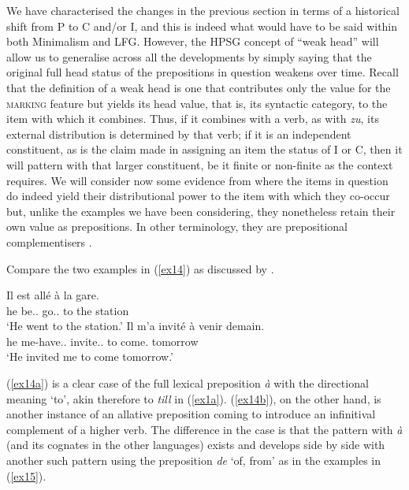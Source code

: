 \documentclass[output=paper]{langsci/langscibook}
\begin{document}
We have characterised the changes in the previous section in terms of a
historical shift from P to C and/or I, and this is indeed what would have to be
said within both Minimalism and \gls{LFG}. However, the \gls{HPSG} concept of
\enquote{weak head} will allow us to generalise across all the developments by
simply saying that the original full head status of the prepositions in
question weakens over time. Recall that the definition of a weak head is one
that contributes only the value for the \textsc{marking} feature but yields its
{\sc head} value, that is, its syntactic category, to the item with which it
combines. Thus, if it combines with a verb, as with  \emph{zu}, its
external distribution is determined by that verb; if it is an independent
constituent, as is the claim made in assigning an item the status of I or C,
then it will pattern with that larger constituent, be it finite or non-finite
as the context requires. We will consider now some evidence from  where
the items in question do indeed yield their distributional power to the item
with which they co-occur but, unlike the  examples we have been
considering, they nonetheless retain their own value as prepositions. In other
terminology, they are prepositional complementisers \citep{Kayne99, Borsley01}.

Compare the two  examples in (\ref{ex14}) as discussed by
\cite{Abeilleetal06}.

\begin{exe}
\ex\label{ex14} 
\begin{xlist}
\ex\label{ex14a}
\gll Il	est all\'e \`a la gare.\\	he be.\Prs.\Tsg{} go.\Pst.\Ptcp{} to the station\\\trans \enquote*{He went to the station.}
\ex\label{ex14b}
\gll Il m'a invit\'e \`a venir demain.\\	he me-have.\Prs.\Tsg{} invite.\Pst.\Ptcp{} to come.\Inf{} tomorrow\\\trans \enquote*{He invited me to come tomorrow.}
\end{xlist}
\end{exe}

(\ref{ex14a}) is a clear case of the full lexical preposition {\it\`a} with the
directional meaning `to', akin therefore to  \emph{till} in
(\ref{ex1a}). (\ref{ex14b}), on the other hand, is another instance of an
allative preposition coming to introduce an infinitival complement of a higher
verb. The difference in the  case is that the pattern with \emph{\`a}
(and its cognates in the other languages) exists and develops side by side with
another such pattern using the preposition \emph{de} `of, from' as in the
examples in (\ref{ex15}).
\end{document}
